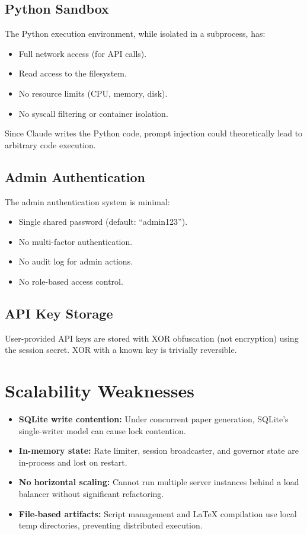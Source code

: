 \subsection{Python Sandbox}

The Python execution environment, while isolated in a subprocess, has:
\begin{itemize}
  \item Full network access (for API calls).
  \item Read access to the filesystem.
  \item No resource limits (CPU, memory, disk).
  \item No syscall filtering or container isolation.
\end{itemize}

Since Claude writes the Python code, prompt injection could theoretically lead to arbitrary code execution.

\subsection{Admin Authentication}

The admin authentication system is minimal:
\begin{itemize}
  \item Single shared password (default: ``admin123'').
  \item No multi-factor authentication.
  \item No audit log for admin actions.
  \item No role-based access control.
\end{itemize}

\subsection{API Key Storage}

User-provided API keys are stored with XOR obfuscation (not encryption) using the session secret.
XOR with a known key is trivially reversible.

\section{Scalability Weaknesses}
\label{sec:weak:scalability}

\begin{itemize}
  \item \textbf{SQLite write contention:} Under concurrent paper generation, SQLite's single-writer model can cause lock contention.
  \item \textbf{In-memory state:} Rate limiter, session broadcaster, and governor state are in-process and lost on restart.
  \item \textbf{No horizontal scaling:} Cannot run multiple server instances behind a load balancer without significant refactoring.
  \item \textbf{File-based artifacts:} Script management and \LaTeX{} compilation use local temp directories, preventing distributed execution.
\end{itemize}

